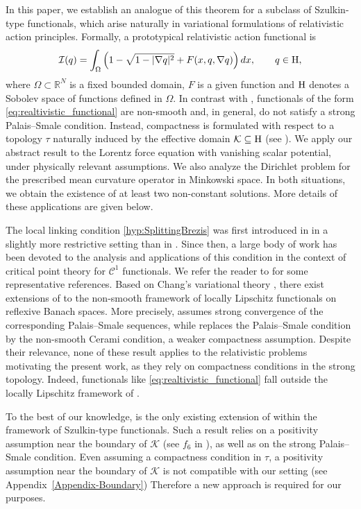 \documentclass{article}
\newcommand{\boK}{\mathcal{K}}
\newcommand{\boI}{\mathcal{I}}
\newcommand{\R}{\mathbb{R}}
\newcommand{\Hilb}{{\textnormal H}}
\theoremstyle{definition}
\begin{document}
In this paper, we establish an analogue of this theorem for a subclass of Szulkin-type functionals, which arise naturally in variational formulations of relativistic action principles. Formally, a prototypical relativistic action functional is 
\begin{equation}\label{eq:realtivistic_functional}
\boI(q)=\int_\Omega\left(1-\sqrt{1-|\nabla q|^2} + F(x,q,\nabla q)\right) dx,\qquad q\in\Hilb,
\end{equation}
where $\Omega\subset\R^N$ is a fixed bounded domain, $F$ is a given function and $\Hilb$ denotes a Sobolev space of functions defined in $\Omega$. In contrast with \cite[Theorem 4]{Bre-Nir}, functionals of the form \eqref{eq:realtivistic_functional} are non-smooth and, in general, do not satisfy a strong Palais--Smale  condition. Instead, compactness is formulated with respect to a topology $\tau$ naturally induced by the effective domain $\boK\subseteq\Hilb$ (see \cite{ABT,GLM}).  We apply our abstract result to the Lorentz force equation with vanishing scalar potential, under physically relevant assumptions. We also analyze the Dirichlet problem for the prescribed mean curvature operator in Minkowski space. In both situations, we obtain the existence of at least two non-constant solutions. More details of these applications are given below. 

The local linking condition \eqref{hyp:SplittingBrezis} was first introduced in \cite{Li-Liu, Li-Liu2} in a slightly more restrictive setting than in \cite{Bre-Nir}. Since then, a large body of work has been devoted to the analysis and applications of this condition in the context of critical point theory for $\mathcal C^1$ functionals. We refer the reader to \cite{FPV,Li-Willem,MBR,Perera} for some representative references. Based on Chang's variational theory \cite{Chang}, there exist extensions of \cite[Theorem 4]{Bre-Nir} to the non-smooth framework of locally Lipschitz functionals on reflexive Banach spaces. More precisely, \cite[Theorem 2.3]{Wu} assumes strong convergence of the corresponding Palais--Smale sequences, while \cite[Theorem 8]{KKP} replaces the Palais--Smale condition by the non-smooth Cerami condition, a weaker compactness assumption. Despite their relevance, none of these result applies to the relativistic problems motivating the present work, as they rely on compactness conditions in the strong topology. Indeed, functionals like \eqref{eq:realtivistic_functional} fall outside the locally Lipschitz framework of \cite{Wu,KKP}.

To the best of our knowledge, \cite[Theorem 3.1]{LMM} is the only existing extension of \cite[Theorem 4]{Bre-Nir} within the framework of Szulkin-type functionals. Such a result relies on a positivity assumption near the boundary of $\boK$ (see $f_6$ in \cite{LMM}), as well as on the strong Palais--Smale condition. Even assuming a compactness condition in $\tau$, a positivity assumption near the boundary of $\boK$ is not compatible with our setting (see Appendix~\ref{Appendix-Boundary}) Therefore a new approach is required for our purposes.
\end{document}
